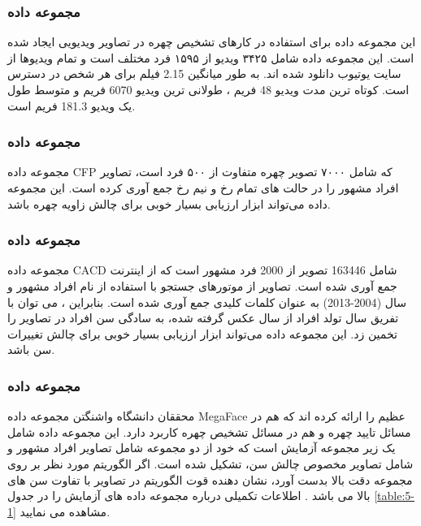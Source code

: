 \subsubsection{مجموعه داده }
این مجموعه داده برای استفاده در کارهای تشخیص چهره در تصاویر ویدیویی ایجاد شده است. این مجموعه داده شامل ۳۴۲۵ ویدیو از ۱۵۹۵ فرد مختلف است و تمام ویدیوها از سایت یوتیوب دانلود شده اند. به طور میانگین 2.15 فیلم برای هر شخص در دسترس است. کوتاه ترین مدت ویدیو 48 فریم ، طولانی ترین ویدیو 6070 فریم و متوسط طول یک ویدیو 181.3 فریم است. \cite{VGGFace2_dataset}

\subsubsection{مجموعه داده }
مجموعه داده CFP  که شامل ۷۰۰۰ تصویر چهره متفاوت از ۵۰۰ فرد است، تصاویر افراد مشهور را در حالت های تمام رخ و نیم رخ جمع آوری کرده است. این مجموعه داده می‌تواند ابزار ارزیابی بسیار خوبی برای چالش زاویه چهره باشد. \cite{LFW_dataset}

\subsubsection{مجموعه داده }
مجموعه داده CACD  شامل 163446 تصویر از 2000 فرد مشهور است که از اینترنت جمع آوری شده است. تصاویر از موتورهای جستجو با استفاده از نام افراد مشهور و سال (2004-2013) به عنوان کلمات کلیدی جمع آوری شده است. بنابراین ، می توان با تفریق سال تولد افراد از سال عکس گرفته شده، به سادگی سن افراد در تصاویر را تخمین زد.  این مجموعه داده می‌تواند ابزار ارزیابی بسیار خوبی برای چالش تغییرات سن باشد. \cite{CACD_dataset}

\subsubsection{مجموعه داده }
محققان دانشگاه واشنگتن مجموعه داده MegaFace  عظیم را ارائه کرده اند که هم در مسائل تایید چهره و هم در مسائل تشخیص چهره کاربرد دارد. این مجموعه داده شامل یک زیر مجموعه آزمایش است که خود از دو مجموعه  شامل تصاویر افراد مشهور و  شامل تصاویر مخصوص چالش سن، تشکیل شده است. اگر الگوریتم مورد نظر بر روی مجموعه  دقت بالا بدست آورد، نشان دهنده قوت الگوریتم در تصاویر با تفاوت سن های بالا می باشد \cite{MegaFace_dataset}. اطلاعات تکمیلی درباره مجموعه داده های آزمایش را در جدول \ref{table:5-1} مشاهده می نمایید.

